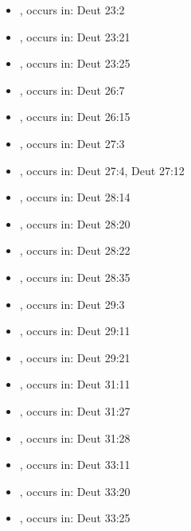 \documentclass[14pt]{article}
\begin{document}
\begin{itemize}
\item {}, occurs in: Deut 23:2

\item {}, occurs in: Deut 23:21

\item {}, occurs in: Deut 23:25

\item {}, occurs in: Deut 26:7

\item {}, occurs in: Deut 26:15

\item {}, occurs in: Deut 27:3

\item {}, occurs in: Deut 27:4, Deut 27:12

\item {}, occurs in: Deut 28:14

\item {}, occurs in: Deut 28:20

\item {}, occurs in: Deut 28:22

\item {}, occurs in: Deut 28:35

\item {}, occurs in: Deut 29:3

\item {}, occurs in: Deut 29:11

\item {}, occurs in: Deut 29:21

\item {}, occurs in: Deut 31:11

\item {}, occurs in: Deut 31:27

\item {}, occurs in: Deut 31:28

\item {}, occurs in: Deut 33:11

\item {}, occurs in: Deut 33:20

\item {}, occurs in: Deut 33:25

\end{itemize}
\end{document}
